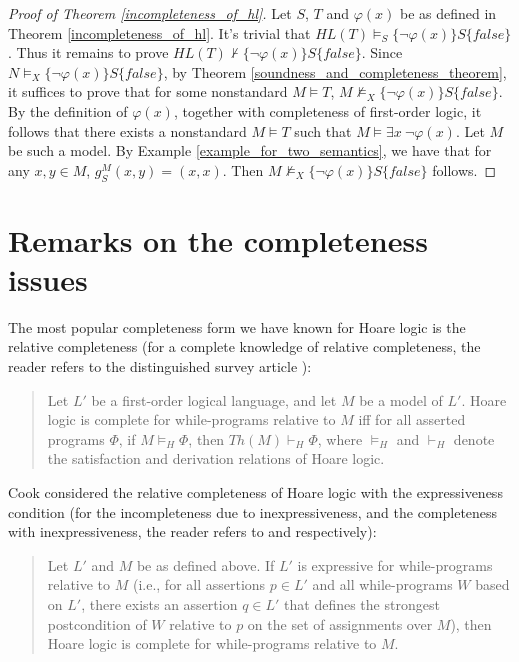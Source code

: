 \documentclass[a4paper,11pt]{article}
\begin{document}
\begin{proof}[Proof of Theorem \ref{incompleteness_of_hl}]
  Let $S$, $T$ and $\varphi(x)$ be as defined in Theorem \ref{incompleteness_of_hl}. It's trivial that $HL(T)\models_S \{\neg\varphi(x)\} S \{false\}$. Thus it remains to prove $HL(T)\nvdash \{\neg\varphi(x)\} S \{false\}$. Since $N \models_X \{\neg\varphi(x)\} S \{false\}$, by Theorem \ref{soundness_and_completeness_theorem}, it suffices to prove that for some nonstandard $M\models T$, $M \not\models_X \{\neg\varphi(x)\} S \{false\}$. By the definition of $\varphi(x)$, together with completeness of first-order logic, it follows that there exists a nonstandard $M\models T$ such that $M\models \exists x\ \neg \varphi(x)$. Let $M$ be such a model. By Example \ref{example_for_two_semantics}, we have that for any $x,y\in M$, $g_S^M(x,y) = (x,x)$. Then $M \not\models_X \{\neg\varphi(x)\} S \{false\}$ follows.
\end{proof}

\section{Remarks on the completeness issues}

The most popular completeness form we have known for Hoare logic is the relative completeness (for a complete knowledge of relative completeness, the reader refers to the distinguished survey article \cite{apt_1}):
\begin{quote}
  Let $L'$ be a first-order logical language, and let $M$ be a model of $L'$. Hoare logic is complete for while-programs relative to $M$ iff for all asserted programs $\Phi$, if $M\models_H \Phi$, then $Th(M)\vdash_H \Phi$, where $\models_H$ and $\vdash_H$ denote the satisfaction and derivation relations of Hoare logic.
\end{quote}


Cook \cite{cook_1} considered the relative completeness of Hoare logic with the expressiveness condition (for the incompleteness due to inexpressiveness, and the completeness with inexpressiveness, the reader refers to \cite{wand_1} and \cite{bergstra_3} respectively):
\begin{quote}
  Let $L'$ and $M$ be as defined above. If $L'$ is expressive for while-programs relative to $M$ (i.e., for all assertions $p\in L'$ and all while-programs $W$ based on $L'$, there exists an assertion $q\in L'$ that defines the strongest postcondition of $W$ relative to $p$ on the set of assignments over $M$), then Hoare logic is complete for while-programs relative to $M$.
\end{quote}
\end{document}
